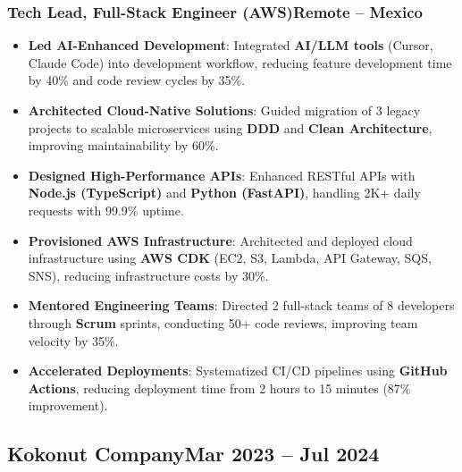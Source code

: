 \documentclass[a4paper,10pt]{article}
\newcommand{\kw}[1]{\textbf{\textcolor{keyword}{#1}}}
\newcommand{\tech}[1]{\textbf{\textcolor{tech}{#1}}}
\begin{document}
\subsubsection*{\small Tech Lead, Full-Stack Engineer (AWS)\hfill Remote -- Mexico}
\begin{itemize}[noitemsep, leftmargin=*]
    \item \textbf{Led AI-Enhanced Development}: Integrated \kw{AI/LLM tools} (Cursor, Claude Code) into development workflow, reducing feature development time by 40\% and code review cycles by 35\%.
    \item \textbf{Architected Cloud-Native Solutions}: Guided migration of 3 legacy projects to scalable microservices using \kw{DDD} and \kw{Clean Architecture}, improving maintainability by 60\%.
    \item \textbf{Designed High-Performance APIs}: Enhanced RESTful APIs with \tech{Node.js (TypeScript)} and \tech{Python (FastAPI)}, handling 2K+ daily requests with 99.9\% uptime.
    \item \textbf{Provisioned AWS Infrastructure}: Architected and deployed cloud infrastructure using \tech{AWS CDK} (EC2, S3, Lambda, API Gateway, SQS, SNS), reducing infrastructure costs by 30\%.
    \item \textbf{Mentored Engineering Teams}: Directed 2 full-stack teams of 8 developers through \kw{Scrum} sprints, conducting 50+ code reviews, improving team velocity by 35\%.
    \item \textbf{Accelerated Deployments}: Systematized CI/CD pipelines using \tech{GitHub Actions}, reducing deployment time from 2 hours to 15 minutes (87\% improvement).
\end{itemize}

\subsection*{\small Kokonut Company\hfill\textbf{Mar 2023 -- Jul 2024}}
\end{document}
